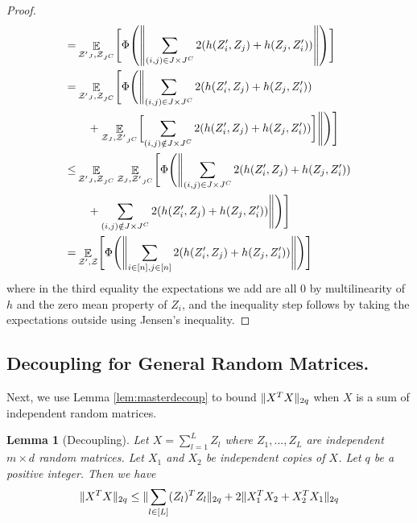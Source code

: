 \documentclass[11pt]{amsart}
\numberwithin{equation}{section}
\numberwithin{equation}{section}
\DeclareMathOperator{\E}{\mathbb{E}}
\DeclarePairedDelimiter{\norm}{\lVert}{\rVert}
\DeclarePairedDelimiter{\paren}{(}{)}
\newtheorem{lemma}[theorem]{Lemma}
\begin{document}
\begin{proof}
\begin{align*}
    =&\E_{\mathcal{Z'}_J, \mathcal{Z}_{J^C} } \Biggl[ \Phi\paren*{ \norm*{  \sum_{(i,j) \in J \times J^C } 2 (h(Z_i', Z_j)+h(Z_j,Z_i')) }}\Biggr] \\
    =&\E_{\mathcal{Z'}_J, \mathcal{Z}_{J^C} } \Biggl[ \Phi\Biggl( \Biggl\|  \sum_{(i,j) \in J \times J^C } 2 (h(Z_i', Z_j)+h(Z_j,Z_i')) \\
    &\quad+ \E_{\mathcal{Z}_J, \mathcal{Z'}_{J^C} }\biggl[\sum_{(i,j) \notin J \times J^C} 2 (h(Z_i', Z_j)+h(Z_j,Z_i'))\biggr]\Biggr\| \Biggr) \Biggr] \\
    \le & \E_{\mathcal{Z'}_J, \mathcal{Z}_{J^C} } \E_{\mathcal{Z}_J, \mathcal{Z'}_{J^C} }\Biggl[ \Phi\Biggl( \Biggl\|  \sum_{(i,j) \in J \times J^C } 2 (h(Z_i', Z_j)+h(Z_j,Z_i')) \\
    &\quad+ \sum_{(i,j) \notin J \times J^C} 2 (h(Z_i', Z_j)+h(Z_j,Z_i'))\Biggr\| \Biggr) \Biggr] \\
    =&\E_{\mathcal{Z'}, \mathcal{Z} } \Biggl[ \Phi\Biggl( \Biggl\|  \sum_{i \in [n], j \in [n] } 2 (h(Z_i', Z_j)+h(Z_j,Z_i')) \Biggr\| \Biggr) \Biggr]
\end{align*}
where in the third equality the expectations we add are all $0$ by multilinearity of $h$ and the zero mean property of $Z_i$, and the inequality step follows by taking the expectations outside using Jensen's inequality. 
\end{proof}


\subsection{Decoupling for General Random Matrices.}

Next, we use Lemma \ref{lem:masterdecoup} to bound $\norm{X^TX}_{2q}$ when $X$ is a sum of independent random matrices.

\begin{lemma}[Decoupling]\label{lem:decgen}
Let $X=\sum \limits_{l=1}^L Z_l$ where $Z_1,...,Z_L$ are independent $m \times d$ random matrices.
 Let $X_1$ and $X_2$ be independent copies of $X$. Let $q$ be a positive integer. Then we have
 \begin{align*}
     \norm{X^TX}_{2q} \le \norm{\sum \limits_{l \in [L]}(Z_l)^TZ_l}_{2q}+2\norm{X_1^TX_2+X_2^TX_1}_{2q}
 \end{align*}
\end{lemma}
\end{document}
